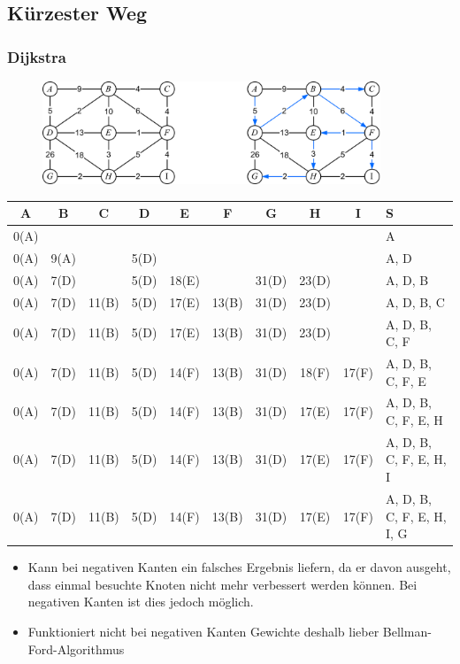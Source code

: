 \subsection{Kürzester Weg}

\subsubsection*{Dijkstra}

\begin{figure}[h]
\centering
\includegraphics[width=0.9\textwidth]{graphics/dijkstra.png}
\end{figure}

\begin{table}[h]
\centering
\begin{tabular}{c|c|c|c|c|c|c|c|c||l}
A & B & C & D & E & F & G & H & I & S\\
\hline
0(A) &      & & & & & & & & A\\
0(A) & 9(A) &       & 5(D) & & & & & & A, D\\
0(A) & 7(D) &       & 5(D) & 18(E) & & 31(D) & 23(D) & & A, D, B\\
0(A) & 7(D) & 11(B) & 5(D) & 17(E) & 13(B) & 31(D) & 23(D) & & A, D, B, C\\
0(A) & 7(D) & 11(B) & 5(D) & 17(E) & 13(B) & 31(D) & 23(D) & & A, D, B, C, F\\
0(A) & 7(D) & 11(B) & 5(D) & 14(F) & 13(B) & 31(D) & 18(F) & 17(F) & A, D, B, C, F, E\\
0(A) & 7(D) & 11(B) & 5(D) & 14(F) & 13(B) & 31(D) & 17(E) & 17(F) & A, D, B, C, F, E, H\\
0(A) & 7(D) & 11(B) & 5(D) & 14(F) & 13(B) & 31(D) & 17(E) & 17(F) & A, D, B, C, F, E, H, I\\
0(A) & 7(D) & 11(B) & 5(D) & 14(F) & 13(B) & 31(D) & 17(E) & 17(F) & A, D, B, C, F, E, H, I, G
\end{tabular}
\end{table}

\begin{itemize}
\item Kann bei negativen Kanten ein falsches Ergebnis liefern, da er davon ausgeht, dass einmal besuchte Knoten nicht mehr verbessert werden können. Bei negativen Kanten ist dies jedoch möglich.
\item Funktioniert nicht bei negativen Kanten Gewichte deshalb lieber Bellman-Ford-Algorithmus
\end{itemize}


